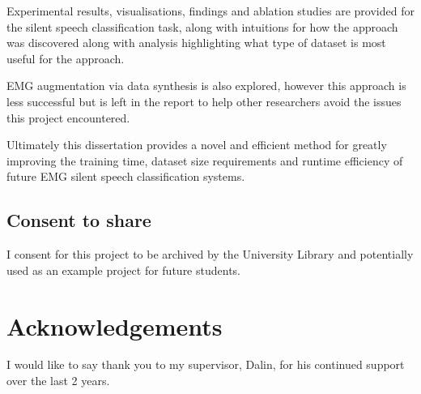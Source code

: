 \documentclass[12pt, a4paper]{report}
\begin{document}
Experimental results, visualisations, findings
and ablation studies are provided
for the silent speech classification task, along with intuitions for how the
approach was discovered along with analysis highlighting what type
of dataset is most useful for the approach.

EMG augmentation via data synthesis is also explored, however this approach
is less successful but is left in the report to help other researchers avoid
the issues this project encountered.

Ultimately this dissertation provides a novel and efficient method for greatly
improving the training time, dataset size requirements
and runtime efficiency of future EMG silent speech classification systems.

\vspace{10mm}
\section*{Consent to share}
I consent for this project to be archived by the University Library and potentially used as an example project for future students.

\newpage
\renewcommand{\contentsname}{Table of Contents}	%
\tableofcontents

\newpage
{}	%
\listoftables

\newpage
{}	%
\listoffigures


\newpage

{}
\chapter*{Acknowledgements}
I would like to say thank you to my supervisor, Dalin, for his continued
support over the last 2 years.
\end{document}
